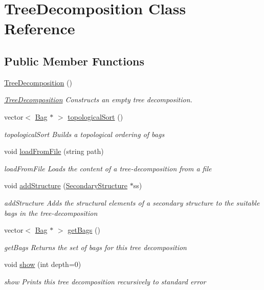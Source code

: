 \hypertarget{class_tree_decomposition}{}\section{Tree\+Decomposition Class Reference}
\label{class_tree_decomposition}
\subsection*{Public Member Functions}
\begin{DoxyCompactItemize}
\item 
\mbox{\label{class_tree_decomposition_a4d68db24421f1c049b6535f760df01c1}} 
\hyperlink{class_tree_decomposition_a4d68db24421f1c049b6535f760df01c1}{Tree\+Decomposition} ()
\begin{DoxyCompactList}\small\item\em \hyperlink{class_tree_decomposition}{Tree\+Decomposition} Constructs an empty tree decomposition. \end{DoxyCompactList}\item 
vector$<$ \hyperlink{class_bag}{Bag} $\ast$ $>$ \hyperlink{class_tree_decomposition_a204777cf6460de25bc733a2fff4fb38c}{topological\+Sort} ()
\begin{DoxyCompactList}\small\item\em topological\+Sort Builds a topological ordering of bags \end{DoxyCompactList}\item 
void \hyperlink{class_tree_decomposition_abc2d6a2e7023ada23048b9a4832ef1b1}{load\+From\+File} (string path)
\begin{DoxyCompactList}\small\item\em load\+From\+File Loads the content of a tree-\/decomposition from a file \end{DoxyCompactList}\item 
void \hyperlink{class_tree_decomposition_acb7575c5835a306e72590fa755cb5009}{add\+Structure} (\hyperlink{class_secondary_structure}{Secondary\+Structure} $\ast$ss)
\begin{DoxyCompactList}\small\item\em add\+Structure Adds the structural elements of a secondary structure to the suitable bags in the tree-\/decomposition \end{DoxyCompactList}\item 
vector$<$ \hyperlink{class_bag}{Bag} $\ast$ $>$ \hyperlink{class_tree_decomposition_a91c0f9cf765260fe982c40fc17c29919}{get\+Bags} ()
\begin{DoxyCompactList}\small\item\em get\+Bags Returns the set of bags for this tree decomposition \end{DoxyCompactList}\item 
void \hyperlink{class_tree_decomposition_a328efa3fba52a273997eac5fe43083f3}{show} (int depth=0)
\begin{DoxyCompactList}\small\item\em show Prints this tree decomposition recursively to standard error \end{DoxyCompactList}\end{DoxyCompactItemize}
